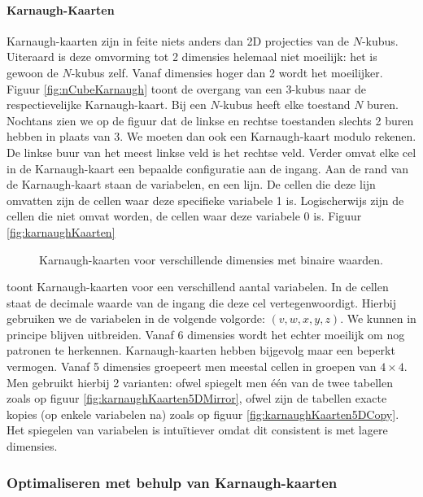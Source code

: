 \paragraph{Karnaugh-Kaarten}Karnaugh-kaarten zijn in feite niets anders dan 2D projecties van de $N$-kubus. Uiteraard is deze omvorming tot 2 dimensies helemaal niet moeilijk: het is gewoon de $N$-kubus zelf. Vanaf dimensies hoger dan 2 wordt het moeilijker. Figuur \ref{fig:nCubeKarnaugh}
toont de overgang van een 3-kubus naar de respectievelijke Karnaugh-kaart. Bij een $N$-kubus heeft elke toestand $N$ buren. Nochtans zien we op de figuur dat de linkse en rechtse toestanden slechts 2 buren hebben in plaats van 3. We moeten dan ook een Karnaugh-kaart modulo rekenen. De linkse buur van het meest linkse veld is het rechtse veld. Verder omvat elke cel in de Karnaugh-kaart een bepaalde configuratie aan de ingang. Aan de rand van de Karnaugh-kaart staan de variabelen, en een lijn. De cellen die deze lijn omvatten zijn de cellen waar deze specifieke variabele 1 is. Logischerwijs zijn de cellen die niet omvat worden, de cellen waar deze variabele 0 is. Figuur \ref{fig:karnaughKaarten}
\begin{figure}[hbt]
\centering
{}
\caption{Karnaugh-kaarten voor verschillende dimensies met binaire waarden.}
\end{figure}
toont Karnaugh-kaarten voor een verschillend aantal variabelen. In de cellen staat de decimale waarde van de ingang die deze cel vertegenwoordigt. Hierbij gebruiken we de variabelen in de volgende volgorde: $\left(v,w,x,y,z\right)$. We kunnen in principe blijven uitbreiden. Vanaf 6 dimensies wordt het echter moeilijk om nog patronen te herkennen. Karnaugh-kaarten hebben bijgevolg maar een beperkt vermogen. Vanaf 5 dimensies groepeert men meestal cellen in groepen van $4\times 4$. Men gebruikt hierbij 2 varianten: ofwel spiegelt men \'e\'en van de twee tabellen zoals op figuur \ref{fig:karnaughKaarten5DMirror}, ofwel zijn de tabellen exacte kopies (op enkele variabelen na) zoals op figuur \ref{fig:karnaughKaarten5DCopy}. Het spiegelen van variabelen is intu\"itiever omdat dit consistent is met lagere dimensies.
\subsubsection{Optimaliseren met behulp van Karnaugh-kaarten}

